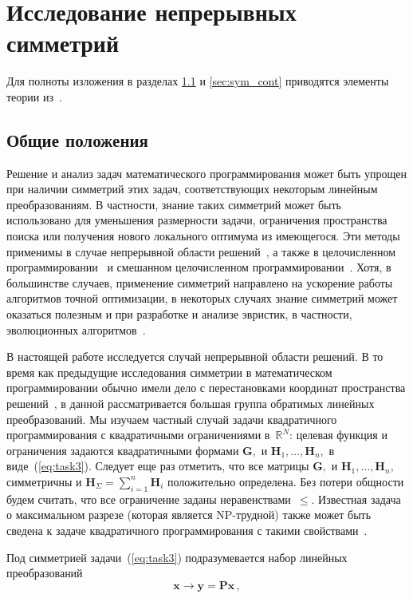 \section{Исследование непрерывных симметрий}

Для полноты изложения в разделах \ref{sec:sym_common} и \ref{sec:sym_cont} приводятся элементы теории из~\cite{yurkov:symmetry}.
\subsection{Общие положения}
\label{sec:sym_common}
Решение и анализ задач математического программирования может быть упрощен при наличии симметрий этих задач, соответствующих некоторым линейным преобразованиям. В частности, знание таких симметрий может быть использовано для уменьшения размерности задачи, ограничения пространства поиска или получения нового локального оптимума из имеющегося. Эти методы применимы в
случае непрерывной области решений~\cite{CHL13,GATERMANN200495,KWM19}, а также в целочисленном программировании~\cite{BHJ13,C99,Kolokolov2012,Margot2010,Simanchev96} и смешанном целочисленном программировании~\cite{L12,PR19}.
Хотя, в большинстве случаев, применение симметрий направлено на ускорение работы алгоритмов точной оптимизации, в некоторых случаях знание симметрий может оказаться полезным и при разработке и анализе эвристик, в частности, эволюционных алгоритмов~\cite{Doerr21,Adam2004}.

В настоящей работе исследуется случай непрерывной области решений. В то время как предыдущие исследования симметрии в математическом программировании обычно имели дело с перестановками координат пространства решений~\cite{Kolokolov2012,KWM19,L12}, в данной рассматривается большая группа обратимых линейных преобразований. Мы изучаем частный случай задачи квадратичного программирования с квадратичными ограничениями в~${\mathbb R}^N$: целевая функция и ограничения задаются квадратичными формами $\textbf{G}, $ и $\textbf{H}_1,\dots,\textbf{H}_n,$ в виде~(\ref{eq:task3}). Следует еще раз отметить, что все матрицы $\textbf{G}, $ и $\textbf{H}_1,\dots,\textbf{H}_n,$ симметричны и $\textbf{H}_\Sigma = \sum_{i=1}^{n}\textbf{H}_i$ положительно определена.
Без потери общности будем считать, что все ограничение заданы неравенствами~$\le$.
Известная задача о максимальном разрезе (которая является NP-трудной) также может быть сведена к задаче квадратичного программирования с такими свойствами~\cite{Shor1998}.

Под симметрией задачи~(\ref{eq:task3}) подразумевается набор линейных преобразований
\begin{equation}
\label{eq:Lin}
\textbf{x} \to \textbf{y}=\textbf{Px} \, ,
\end{equation}
%

